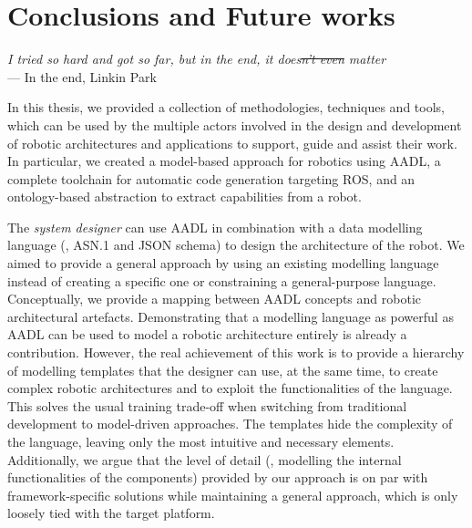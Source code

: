 \chapter[Conclusions and Future works]{Conclusions and Future works}\label{ch:Conclusions}

\begin{flushright}{\slshape I tried so hard and got so far, but in the end, it does\st{n't even} matter} \\ \medskip
    ---  In the end, Linkin Park
\end{flushright}


In this thesis, we provided a collection of methodologies, techniques and tools, which can be used by the multiple actors involved in the design and development of robotic architectures and applications to support, guide and assist their work. In particular, we created a model-based approach for robotics using AADL, a complete toolchain for automatic code generation targeting ROS, and an ontology-based abstraction to extract capabilities from a robot.

The \textit{system designer} can use AADL in combination with a data modelling language (\ie, ASN.1 and JSON schema) to design the architecture of the robot. We aimed to provide a general approach by using an existing modelling language instead of creating a specific one or constraining a general-purpose language. Conceptually, we provide a mapping between AADL concepts and robotic architectural artefacts. Demonstrating that a modelling language as powerful as AADL can be used to model a robotic architecture entirely is already a contribution. However, the real achievement of this work is to provide a hierarchy of modelling templates that the designer can use, at the same time, to create complex robotic architectures and to exploit the functionalities of the language. This solves the usual training trade-off when switching from traditional development to model-driven approaches. The templates hide the complexity of the language, leaving only the most intuitive and necessary elements. Additionally, we argue that the level of detail (\ie, modelling the internal functionalities of the components) provided by our approach is on par with framework-specific solutions while maintaining a general approach, which is only loosely tied with the target platform.

